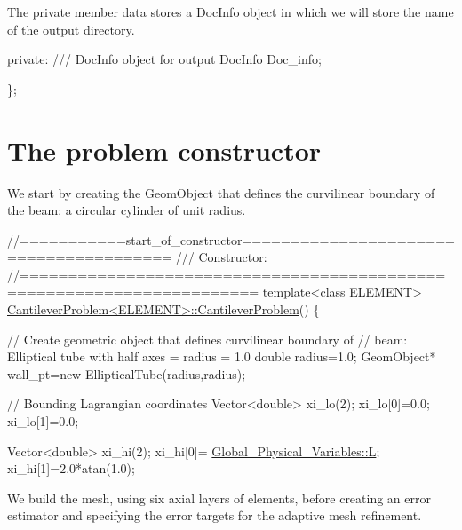 The private member data stores a {\ttfamily Doc\+Info} object in which we will store the name of the output directory.


\begin{DoxyCodeInclude}
\textcolor{keyword}{private}:
\textcolor{comment}{}
\textcolor{comment}{ /// DocInfo object for output}
\textcolor{comment}{} DocInfo Doc\_info;
 
\};

\end{DoxyCodeInclude}




 

\hypertarget{index_constructor}{}\section{The problem constructor}\label{index_constructor}
We start by creating the {\ttfamily Geom\+Object} that defines the curvilinear boundary of the beam\+: a circular cylinder of unit radius.


\begin{DoxyCodeInclude}
\textcolor{comment}{//===========start\_of\_constructor======================================= }
\textcolor{comment}{/// Constructor: }
\textcolor{comment}{}\textcolor{comment}{//====================================================================== }
\textcolor{keyword}{template}<\textcolor{keyword}{class} ELEMENT>
\hyperlink{classCantileverProblem_abba97fc4b8402bc0363fdf16322f6572}{CantileverProblem<ELEMENT>::CantileverProblem}() 
\{

 \textcolor{comment}{// Create geometric object that defines curvilinear boundary of}
 \textcolor{comment}{// beam: Elliptical tube with half axes = radius = 1.0}
 \textcolor{keywordtype}{double} radius=1.0;
 GeomObject* wall\_pt=\textcolor{keyword}{new} EllipticalTube(radius,radius);
 
 \textcolor{comment}{// Bounding Lagrangian coordinates}
 Vector<double> xi\_lo(2);
 xi\_lo[0]=0.0;
 xi\_lo[1]=0.0;

 Vector<double> xi\_hi(2);
 xi\_hi[0]= \hyperlink{namespaceGlobal__Physical__Variables_a1b8bfc451f6b7ac89eca18f04338f47f}{Global\_Physical\_Variables::L};
 xi\_hi[1]=2.0*atan(1.0);

\end{DoxyCodeInclude}


We build the mesh, using six axial layers of elements, before creating an error estimator and specifying the error targets for the adaptive mesh refinement.



